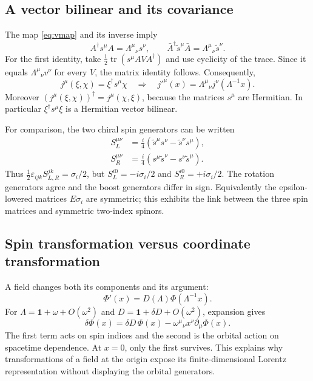 \documentclass[11pt]{article}
\newcommand{\tr}{\operatorname{tr}}
\newcommand{\eps}{\varepsilon}
\newcommand{\one}{\mathbf 1}
\begin{document}
\subsection{A vector bilinear and its covariance}
The map \eqref{eq:vmap} and its inverse imply
\begin{equation}
 A^\dagger s^\mu A=\Lambda^\mu{}_{\nu}s^\nu,
 \qquad
 \bar A^\dagger\widetilde s^\mu\bar A
       =\Lambda^\mu{}_{\nu}\widetilde s^\nu.
 \label{eq:covsigma}
\end{equation}
For the first identity, take \(\tfrac12\tr(s^\mu A V A^\dagger)\)
and use cyclicity of the trace. Since it equals
\(\Lambda^\mu{}_{\nu}v^\nu\) for every \(V\), the matrix identity
follows. Consequently,
\begin{equation}
 j^\mu(\xi,\chi)=\xi^\dagger s^\mu\chi
 \quad\Longrightarrow\quad
 j'^\mu(x)=\Lambda^\mu{}_{\nu}j^\nu(\Lambda^{-1}x).
 \label{eq:j}
\end{equation}
Moreover \((j^\mu(\xi,\chi))^\dagger=j^\mu(\chi,\xi)\), because
the matrices \(s^\mu\) are Hermitian. In particular
\(\xi^\dagger s^\mu\xi\) is a Hermitian vector bilinear.

For comparison, the two chiral spin generators can be written
\begin{align}
 S_L^{\mu\nu}&=\frac{i}{4}
   (\widetilde s^\mu s^\nu-\widetilde s^\nu s^\mu),\nonumber\\
 S_R^{\mu\nu}&=\frac{i}{4}
   (s^\mu\widetilde s^\nu-s^\nu\widetilde s^\mu).
 \label{eq:twogenerators}
\end{align}
Thus \(\tfrac12\eps_{ijk}S_{L,R}^{jk}=\sigma_i/2\), but
\(S_L^{i0}=-i\sigma_i/2\) and \(S_R^{i0}=+i\sigma_i/2\).
The rotation generators agree and the boost generators differ in sign.
Equivalently the epsilon-lowered matrices \(E\sigma_i\) are symmetric;
this exhibits the link between the three spin matrices and symmetric
two-index spinors.

\subsection{Spin transformation versus coordinate transformation}
A field changes both its components and its argument:
\begin{equation}
 \Phi'(x)=D(\Lambda)\Phi(\Lambda^{-1}x).
 \label{eq:fieldlaw}
\end{equation}
For \(\Lambda=\one+\omega+O(\omega^2)\) and
\(D=\one+\delta D+O(\omega^2)\), expansion gives
\begin{equation}
 \delta\Phi(x)=\delta D\,\Phi(x)
            -\omega^\mu{}_{\nu}x^\nu\partial_\mu\Phi(x).
 \label{eq:orbitalspin}
\end{equation}
The first term acts on spin indices and the second is the orbital
action on spacetime dependence. At \(x=0\), only the first survives.
This explains why transformations of a field at the origin expose its
finite-dimensional Lorentz representation without displaying the
orbital generators.
\end{document}
